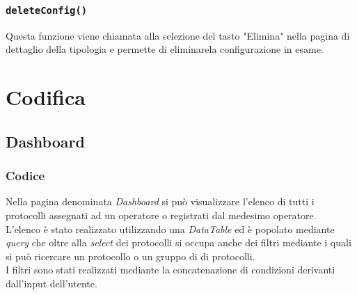     \subsubsection{\texttt{deleteConfig()}}
    Questa funzione viene chiamata alla selezione del tasto "Elimina" nella pagina di dettaglio della tipologia e permette di eliminarela configurazione in esame.

\section{Codifica}
\subsection{Dashboard}

    \subsubsection{Codice}
        Nella pagina denominata \textit{Dashboard} si può visualizzare l'elenco di tutti i protocolli assegnati ad un operatore o registrati dal medesimo operatore.
        \\ 
        L'elenco è stato realizzato utilizzando una \textit{DataTable} ed è popolato mediante \textit{query} che oltre alla \textit{select} dei protocolli si occupa anche dei filtri mediante i quali si può ricercare un protocollo o un gruppo di di protocolli.
        \\
        I filtri sono stati realizzati mediante la concatenazione di condizioni derivanti dall'input dell'utente.
        
